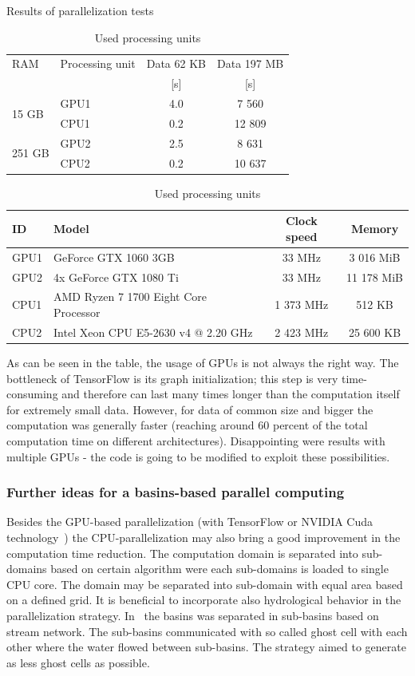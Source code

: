 \begin{table}[h]
  \centering
  \caption{Results of parallelization tests}
  \makegapedcells
  \begin{tabular}{|l|p{2.2cm}|c|c|}\hline
    RAM & Processing unit & Data 62 KB & Data 197 MB\\
     & & [s] & [s]\\\hline
    \multirow{2}{*}{15 GB} & GPU1 & 4.0 & 7 560\\
    & CPU1 & 0.2 & 12 809\\\hline
    \multirow{2}{*}{251 GB} & GPU2 & 2.5 & 8 631\\
    & CPU2 & 0.2 & 10 637\\\hline
  \end{tabular}
  \label{tab:GPU_results}
  \caption{Used processing units}
  \begin{tabular}{|l|p{1.9cm}|c|c|}\hline
    ID & Model & Clock speed & Memory\\\hline
    GPU1 & GeForce GTX 1060 3GB & 33 MHz & 3 016 MiB \\\hline
    GPU2 & 4x GeForce GTX 1080 Ti & 33 MHz & 11 178 MiB \\\hline
    CPU1 & AMD Ryzen 7 1700 Eight Core Processor & 1 373 MHz & 512 KB \\\hline
    CPU2 & Intel Xeon CPU E5-2630 v4 @ 2.20 GHz & 2 423 MHz & 25 600 KB \\\hline
  \end{tabular}
\end{table}

As can be seen in the table, the usage of GPUs is not always the right way.
The bottleneck of TensorFlow is its graph initialization; this step is very
time-consuming and therefore can last many times longer than the computation
itself for extremely small data. However, for data of common size and bigger
the computation was generally faster (reaching around 60 percent of the total
computation time on different architectures). Disappointing were results with
multiple GPUs - the code is going to be modified to exploit these
possibilities.

\subsubsection{Further ideas for a basins-based parallel computing}
Besides the GPU-based parallelization (with TensorFlow \cite{tensorflow2015-whitepaper} or
NVIDIA Cuda technology~\cite{Kalyanapu2011,Le2015}) the
CPU-parallelization may also bring a good improvement in the computation
time reduction. The computation domain is separated into sub-domains
based on certain algorithm were each sub-domains is loaded to single
CPU core. The domain may be separated into sub-domain with equal area
based on a defined grid. It is beneficial to incorporate also
hydrological behavior in the parallelization
strategy. In~\cite{Vivoni2011} the basins was separated in sub-basins
based on stream network. The sub-basins communicated with so called
ghost cell with each other where the water flowed between
sub-basins. The strategy aimed to generate as less ghost cells as
possible.

